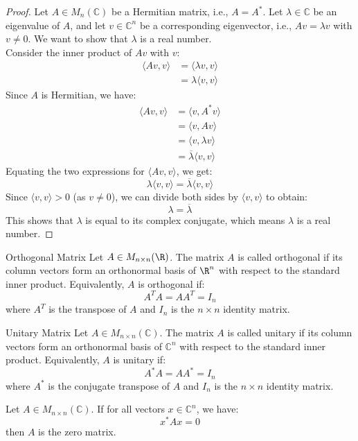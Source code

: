 \documentclass[openany]{book}
\renewcommand{\C}{\mathbb{C}}
\begin{document}
\begin{proof}
Let $A \in M_n(\C)$ be a Hermitian matrix, i.e., $A = A^*$. Let $\lambda \in \C$ be an eigenvalue of $A$, and let $v \in \C^n$ be a corresponding eigenvector, i.e., $Av = \lambda v$ with $v \neq 0$. We want to show that $\lambda$ is a real number. \\
Consider the inner product of $Av$ with $v$:
\[\begin{aligned}
\langle Av, v \rangle &= \langle \lambda v, v \rangle \\
&= \lambda \langle v, v \rangle
\end{aligned}\]
Since $A$ is Hermitian, we have:
\[\begin{aligned}
\langle Av, v \rangle &= \langle v, A^* v \rangle \\
&= \langle v, Av \rangle \\
&= \langle v, \lambda v \rangle \\
&= \overline{\lambda} \langle v, v \rangle
\end{aligned}\]
Equating the two expressions for $\langle Av, v \rangle$, we get:
$$\lambda \langle v, v \rangle = \overline{\lambda} \langle v, v \rangle$$
Since $\langle v, v \rangle > 0$ (as $v \neq 0$), we can divide both sides by $\langle v, v \rangle$ to obtain:
$$\lambda = \overline{\lambda}$$
This shows that $\lambda$ is equal to its complex conjugate, which means $\lambda$ is a real number.
\end{proof}
\begin{mydefinition}{Orthogonal Matrix}
    Let $A \in M_{n\times n}(\R)$. The matrix $A$ is called orthogonal if its column vectors form an orthonormal basis of $\R^n$ with respect to the standard inner product. Equivalently, $A$ is orthogonal if:
    $$A^T A = AA^T = I_n$$
    where $A^T$ is the transpose of $A$ and $I_n$ is the $n \times n$ identity matrix.
\end{mydefinition}
\begin{mydefinition}{Unitary Matrix}
    Let $A \in M_{n\times n}(\C)$. The matrix $A$ is called unitary if its column vectors form an orthonormal basis of $\C^n$ with respect to the standard inner product. Equivalently, $A$ is unitary if:
    $$A^* A = AA^* = I_n$$
    where $A^*$ is the conjugate transpose of $A$ and $I_n$ is the $n \times n$ identity matrix.
\end{mydefinition}
\begin{mytheorem}[Only Complex Matrix satisfying $x^* A x = 0$ is the Zero Matrix]
    Let $A \in M_{n\times n}(\C)$. If for all vectors $x \in \C^n$, we have:
    $$x^* A x = 0$$
    then $A$ is the zero matrix.
\end{mytheorem}
\end{document}
